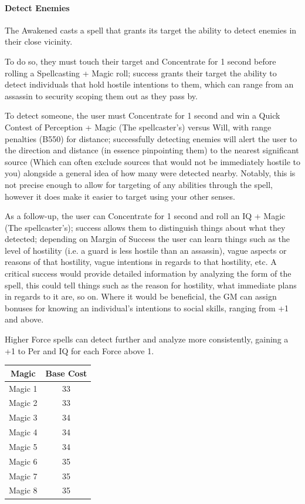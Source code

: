 \begin{multicols}{3}
	\paragraph{Detect Enemies}
	
	The Awakened casts a spell that grants its target the ability to detect enemies in their close vicinity.
	
	To do so, they must touch their target and Concentrate for 1 second before rolling a Spellcasting + Magic roll; success grants their target the ability to detect individuals that hold hostile intentions to them, which can range from an assassin to security scoping them out as they pass by. 
	
	To detect someone, the user must Concentrate for 1 second and win a Quick Contest of Perception + Magic (The spellcaster's) versus Will, with range penalties (B550) for distance; successfully detecting enemies will alert the user to the direction and distance (in essence pinpointing them) to the nearest significant source (Which can often exclude sources that would not be immediately hostile to you) alongside a general idea of how many were detected nearby. Notably, this is not precise enough to allow for targeting of any abilities through the spell, however it does make it easier to target using your other senses.
	
	As a follow-up, the user can Concentrate for 1 second and roll an IQ + Magic (The spellcaster's); success allows them to distinguish things about what they detected; depending on Margin of Success the user can learn things such as the level of hostility (i.e. a guard is less hostile than an assassin), vague aspects or reasons of that hostility, vague intentions in regards to that hostility, etc. A critical success would provide detailed information by analyzing the form of the spell, this could tell things such as the reason for hostility, what immediate plans in regards to it are, so on. Where it would be beneficial, the GM can assign bonuses for knowing an individual's intentions to social skills, ranging from +1 and above.
	
	Higher Force spells can detect further and analyze more consistently, gaining a +1 to Per and IQ for each Force above 1.	
	
	\begin{center}
		\begin{tabular}{|c|c|}
			\hline
			Magic & Base Cost \\
			\hline
			\hline
			Magic 1 & 33 \\
			Magic 2 & 33 \\
			Magic 3 & 34 \\
			Magic 4 & 34 \\
			Magic 5 & 34 \\
			Magic 6 & 35 \\
			Magic 7 & 35 \\
			Magic 8 & 35 \\
			\hline
		\end{tabular}
	\end{center} 
	

\end{multicols}
